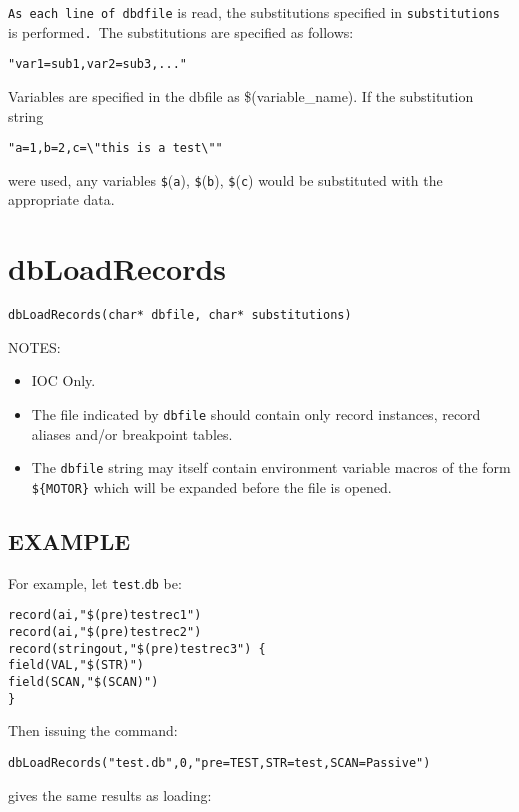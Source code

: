 \verb|As each line of dbdfile| is read, the substitutions specified in \verb|substitutions| is performed\verb|. |The 
substitutions are specified as follows:

\begin{verbatim}"var1=sub1,var2=sub3,..."
\end{verbatim}Variables are specified in the dbfile as \$(variable\_name). If the substitution string

\begin{verbatim}"a=1,b=2,c=\"this is a test\""
\end{verbatim}were used, any variables \verb|$|(\verb|a|), \verb|$|(\verb|b|), \verb|$|(\verb|c|) would be substituted with the appropriate data.

\section{dbLoadRecords}

\begin{verbatim}dbLoadRecords(char* dbfile, char* substitutions)
\end{verbatim}NOTES:

\begin{itemize}\item IOC Only.

\item The file indicated by \verb|dbfile| should contain only record instances, record aliases and/or breakpoint tables.

\item The \verb|dbfile| string may itself contain environment variable macros of the form \verb|${MOTOR}| which will be 
expanded before the file is opened.

\end{itemize}\subsection{EXAMPLE}

For example, let \verb|test|.\verb|db| be:

\begin{verbatim}record(ai,"$(pre)testrec1")
record(ai,"$(pre)testrec2")
record(stringout,"$(pre)testrec3") {
field(VAL,"$(STR)")
field(SCAN,"$(SCAN)")
}
\end{verbatim}Then issuing the command:

\begin{verbatim}dbLoadRecords("test.db",0,"pre=TEST,STR=test,SCAN=Passive")
\end{verbatim}gives the same results as loading:

